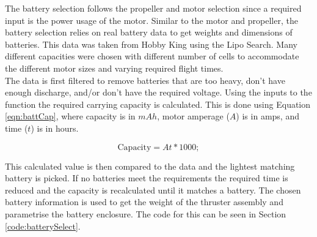 \documentclass[../main.tex]{subfiles}
\begin{document}
The battery selection follows the propeller and motor selection since a required input is the power usage of the motor. Similar to the motor and propeller, the battery selection relies on real battery data to get weights and dimensions of batteries. This data was taken from Hobby King \cite{Hobbyking} using the Lipo Search. Many different capacities were chosen with different number of cells to accommodate the different motor sizes and varying required flight times.\\

The data is first filtered to remove batteries that are too heavy, don't have enough discharge, and/or don't have the required voltage. Using the inputs to the function the required carrying capacity is calculated. This is done using Equation \ref{eqn:battCap}, where capacity is in $mAh$, motor amperage ($A$) is in amps, and time ($t$) is in hours.

\begin{equation} \label{eqn:battCap}
\text{Capacity} = At*1000;
\end{equation}

This calculated value is then compared to the data and the lightest matching battery is picked. If no batteries meet the requirements the required time is reduced and the capacity is recalculated until it matches a battery. The chosen battery information is used to get the weight of the thruster assembly and parametrise the battery enclosure. The code for this can be seen in Section \ref{code:batterySelect}.
\end{document}
